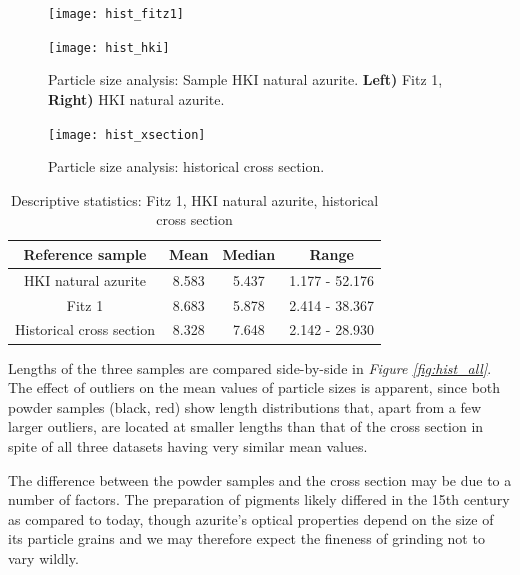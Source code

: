 \begin{figure}[H]
\centering
\begin{minipage}{.45\textwidth}
  \centering
  \texttt{[image: hist\_fitz1]}
\end{minipage}
\begin{minipage}{.45\textwidth}
  \centering
  \texttt{[image: hist\_hki]}
\end{minipage}
\caption[Particle size analysis: HKI natural azurite, Fitz 1]{Particle size analysis: Sample HKI natural azurite. \textbf{Left)} Fitz 1, \textbf{Right)} HKI natural azurite.}
\label{fig:histogram_length}
\end{figure}

\begin{figure}[H]
\centering
  \texttt{[image: hist\_xsection]}
\caption[Particle size analysis: historical cross section]{Particle size analysis: historical cross section.} 
\label{fig:hist_xsec}
\end{figure}

\begin{table}[H]
\caption{Descriptive statistics: Fitz 1, HKI natural azurite, historical cross section}
\centering
\label{table:r_stats}
\begin{tabular}{c c c c}
\toprule
Reference sample & Mean & Median & Range \\
\midrule
HKI natural azurite & 8.583 & 5.437 & 1.177 - 52.176 \\
Fitz 1 & 8.683 & 5.878 & 2.414 - 38.367 \\
Historical cross section & 8.328 & 7.648 & 2.142 - 28.930 \\
\bottomrule
\end{tabular}
\end{table}

Lengths of the three samples are compared side-by-side in \textit{Figure \ref{fig:hist_all}}. The effect of outliers on the mean values of particle sizes is apparent, since both powder samples (black, red) show length distributions that, apart from a few larger outliers, are located at smaller lengths than that of the cross section in spite of all three datasets having very similar mean values. 

The difference between the powder samples and the cross section may be due to a number of factors. The preparation of pigments likely differed in the 15th century as compared to today, though azurite's optical properties depend on the size of its particle grains and we may therefore expect the fineness of grinding not to vary wildly. 

